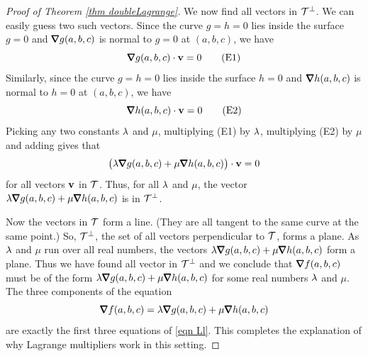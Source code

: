 \begin{proof}[Proof of Theorem \ref{thm doubleLagrange}]
We now find all vectors in $\mathcal{T}^\perp$. We can easily guess two such vectors. 
Since the curve $g=h=0$ lies inside the surface $g=0$ and 
$\vnabla g(a,b,c)$
is normal to $g=0$ at $(a,b,c)$, we have
\begin{equation*}
\vnabla g(a,b,c) \cdot \vv=0
\tag{E1}\end{equation*}
Similarly, since the curve $g=h=0$ lies inside the surface $h=0$ 
and $\vnabla h(a,b,c)$ is normal to $h=0$ at $(a,b,c)$, we have
\begin{equation*}
\vnabla h(a,b,c) \cdot \vv=0
\tag{E2}\end{equation*}
Picking any two constants $\lambda$ and $\mu$, multiplying (E1)
by $\lambda$, multiplying (E2) by $\mu$ and adding gives that
\begin{equation*}
\big(\la\vnabla g(a,b,c)
     +\mu\vnabla h(a,b,c)\big) \cdot \vv=0
\end{equation*}
for all vectors $\mathbf{v}$  in $\mathcal{T}$. Thus, for all $\lambda$ and $\mu$, the
vector $\la\vnabla g(a,b,c)+\mu\vnabla h(a,b,c)$ 
is in $\mathcal{T}^\perp$.

Now the vectors in $\mathcal{T}$ form a line. (They are all tangent to the same 
curve at the same point.) So, $\mathcal{T}^\perp$, the set of all vectors 
perpendicular to $\mathcal{T}$,  forms a plane. As $\lambda$ and $\mu$ run over all 
real numbers, the vectors $\la\vnabla g(a,b,c)
+\mu\vnabla h(a,b,c)$  form a plane. Thus we have found all vector
in $\mathcal{T}^\perp$ and we conclude that $\vnabla f(a,b,c)$ must be
of the form $\la\vnabla g(a,b,c)+\mu\vnabla h(a,b,c)$ 
for some real numbers $\lambda$ and $\mu$. The three components of the
equation
$$
\vnabla f(a,b,c)
=\la\vnabla g(a,b,c)+\mu\vnabla h(a,b,c)
$$
are exactly the first three equations of \eqref{eqn Ll}. This completes the
explanation of why Lagrange multipliers work in this setting.
\end{proof}


